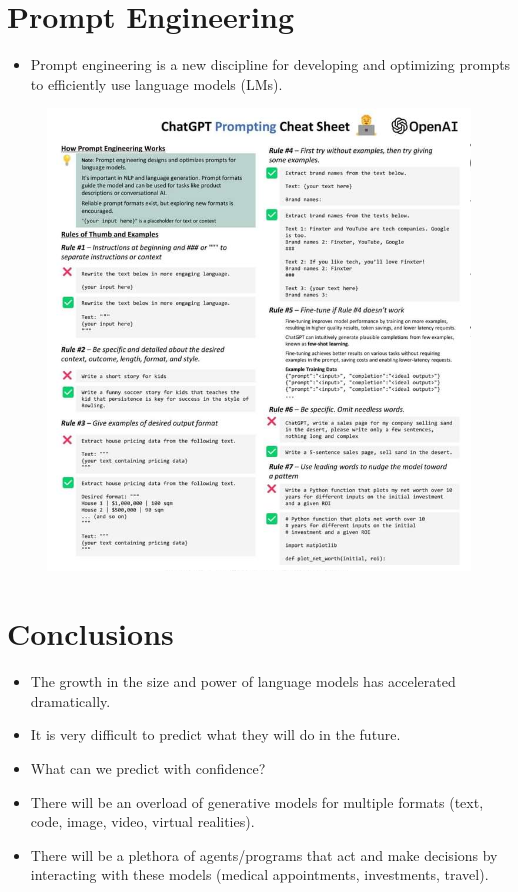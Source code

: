 \section{Prompt Engineering}
\begin{itemize}
\item Prompt engineering is a new discipline for developing and optimizing prompts to efficiently use language models (LMs).
\end{itemize}
 \begin{figure}[h]
        	\includegraphics[scale = 0.33]{pics/prompting.png}
        \end{figure}



\section{Conclusions}
\begin{itemize}
\item The growth in the size and power of language models has accelerated dramatically.
\item It is very difficult to predict what they will do in the future.
\item What can we predict with confidence?
\item There will be an overload of generative models for multiple formats (text, code, image, video, virtual realities).
\item There will be a plethora of agents/programs that act and make decisions by interacting with these models (medical appointments, investments, travel).
\end{itemize}

